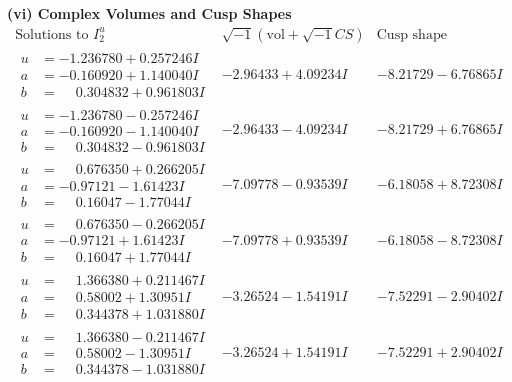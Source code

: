 \documentclass[1p]{elsarticle_modified}
\theoremstyle{definition}
\newcommand{\I}{\sqrt{-1}}
\begin{document}
\newpage\flushleft \textbf{(vi) Complex Volumes and Cusp Shapes}
$$\begin{array}{c|c|c}  
\text{Solutions to }I^u_{2}& \I (\text{vol} + \sqrt{-1}CS) & \text{Cusp shape}\\
 \hline 
\begin{aligned}
u &= -1.236780 + 0.257246 I \\
a &= -0.160920 + 1.140040 I \\
b &= \phantom{-}0.304832 + 0.961803 I\end{aligned}
 & -2.96433 + 4.09234 I & -8.21729 - 6.76865 I \\ \hline\begin{aligned}
u &= -1.236780 - 0.257246 I \\
a &= -0.160920 - 1.140040 I \\
b &= \phantom{-}0.304832 - 0.961803 I\end{aligned}
 & -2.96433 - 4.09234 I & -8.21729 + 6.76865 I \\ \hline\begin{aligned}
u &= \phantom{-}0.676350 + 0.266205 I \\
a &= -0.97121 - 1.61423 I \\
b &= \phantom{-}0.16047 - 1.77044 I\end{aligned}
 & -7.09778 - 0.93539 I & -6.18058 + 8.72308 I \\ \hline\begin{aligned}
u &= \phantom{-}0.676350 - 0.266205 I \\
a &= -0.97121 + 1.61423 I \\
b &= \phantom{-}0.16047 + 1.77044 I\end{aligned}
 & -7.09778 + 0.93539 I & -6.18058 - 8.72308 I \\ \hline\begin{aligned}
u &= \phantom{-}1.366380 + 0.211467 I \\
a &= \phantom{-}0.58002 + 1.30951 I \\
b &= \phantom{-}0.344378 + 1.031880 I\end{aligned}
 & -3.26524 - 1.54191 I & -7.52291 - 2.90402 I \\ \hline\begin{aligned}
u &= \phantom{-}1.366380 - 0.211467 I \\
a &= \phantom{-}0.58002 - 1.30951 I \\
b &= \phantom{-}0.344378 - 1.031880 I\end{aligned}
 & -3.26524 + 1.54191 I & -7.52291 + 2.90402 I \\ \hline\begin{aligned}

\end{aligned}
\end{array}$$
\end{document}
